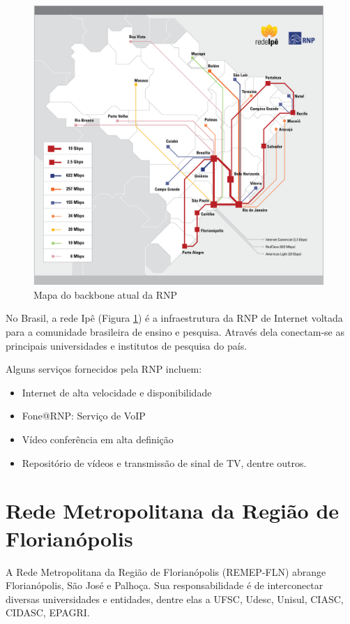 \documentclass[brazil,times]{abnt}
\begin{document}
\begin{figure}[htp]
\begin{center}
  \includegraphics[width=110mm]{imagens/backbone-rnp-201005.png}
  \caption[Mapa do backbone atual da RNP]{Mapa do backbone atual da RNP}
  \label{backbone-rnp}
\end{center}
\end{figure}

No Brasil, a rede Ipê (Figura \ref{backbone-rnp}) é a infraestrutura da RNP de
Internet voltada para a comunidade brasileira de ensino e pesquisa. Através dela conectam-se as
principais universidades e institutos de pesquisa do país.\cite{home-rnp}

Alguns serviços fornecidos pela RNP incluem:
\begin{itemize}
  \item Internet de alta velocidade e disponibilidade
  \item Fone@RNP: Serviço de VoIP
  \item Vídeo conferência em alta definição
  \item Repositório de vídeos e transmissão de sinal de TV, dentre outros.
\end{itemize}

\section*{Rede Metropolitana da Região de Florianópolis}
A Rede Metropolitana da Região de Florianópolis (REMEP-FLN) abrange
Florianópolis, São José e Palhoça. Sua responsabilidade é de interconectar
diversas universidades e entidades, dentre elas a UFSC, Udesc, Unisul, CIASC,
CIDASC, EPAGRI. \cite{apresentacao-remep}
\end{document}
